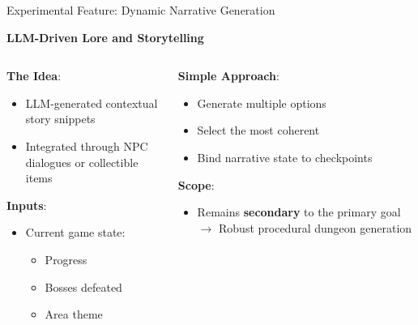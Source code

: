 \documentclass{beamer}
\begin{document}
\begin{frame}{Experimental Feature: Dynamic Narrative Generation}
    \begin{center}
        \textbf{LLM-Driven Lore and Storytelling}
    \end{center}

    \begin{columns}[T]
        \begin{column}{0.48\textwidth}
            \textbf{The Idea}:
            \begin{itemize}
                \item LLM-generated contextual story snippets
                \item Integrated through NPC dialogues or collectible items
            \end{itemize}

            \vspace{0.3cm}
            \textbf{Inputs}:
            \begin{itemize}
                \item Current game state:
                \begin{itemize}
                    \item Progress
                    \item Bosses defeated
                    \item Area theme
                \end{itemize}
            \end{itemize}
        \end{column}

        \begin{column}{0.48\textwidth}
            \textbf{Simple Approach}:
            \begin{itemize}
                \item Generate multiple options
                \item Select the most coherent
                \item Bind narrative state to checkpoints
            \end{itemize}

            \vspace{0.3cm}
            \textbf{Scope}:
            \begin{itemize}
                \item Remains \textbf{secondary} to the primary goal $\rightarrow$ \textcolor{ubburgundy}{Robust procedural dungeon generation}
            \end{itemize}
        \end{column}
    \end{columns}
\end{frame}
\end{document}
